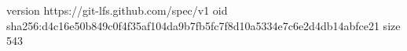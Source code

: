 version https://git-lfs.github.com/spec/v1
oid sha256:d4c16e50b849c0f4f35af104da9b7fb5fc7f8d10a5334e7c6e2d4db14abfce21
size 543
